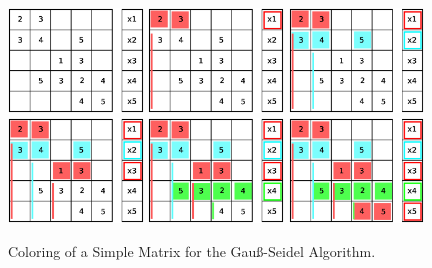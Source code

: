 \documentclass[a4paper,11pt]{scrartcl}
\begin{document}
\begin{figure}
\includegraphics[width=0.32\textwidth]{graphic/coloringGS1.eps}\hfill\vline\hfill
\includegraphics[width=0.32\textwidth]{graphic/coloringGS4.eps}\hfill\vline\hfill
\includegraphics[width=0.32\textwidth]{graphic/coloringGS7.eps}
\includegraphics[width=0.32\textwidth]{graphic/coloringGS8.eps}\hfill\vline\hfill
\includegraphics[width=0.32\textwidth]{graphic/coloringGS9.eps}\hfill\vline\hfill
\includegraphics[width=0.32\textwidth]{graphic/coloringGS10.eps}
\caption{Coloring of a Simple Matrix for the Gauß-Seidel Algorithm.}
\label{figure:coloringGS}
\end{figure}
\end{document}
